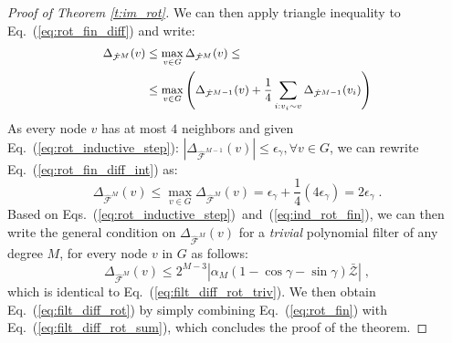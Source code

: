 \documentclass[10pt,journal,compsoc]{IEEEtran}
\newcommand{\renata}[1]{\textcolor{black}{#1}}
\newcommand{\hmF}{\hat{\mathcal{F}}}
\newcommand{\norm}[1]{\left|#1\right|}
\begin{document}
\begin{proof}[Proof of Theorem \ref{t:im_rot}]
		\noindent
			We can then apply triangle inequality to Eq.~(\ref{eq:rot_fin_diff}) and write:
		\begin{equation}
		\small
		\begin{aligned}
		\Delta_{\hmF^{M}} (v) & \leq \max_{v \in G} \Delta_{\hmF^{M}} (v) \leq \\
		& \leq \max_{v \in G} \left( \Delta_{\hmF^{M-1}}(v) + \frac{1}{4} \sum\limits_{i: v_i \sim v} \Delta_{\hmF^{M-1}} (v_i) \right)
		\end{aligned}
		\label{eq:rot_fin_diff_int}
		\end{equation}
		\noindent
		As every node $v$ has at most $4$ neighbors and given Eq.~({\ref{eq:rot_inductive_step}): $| \Delta_{\hmF^{M-1}} (v) | \leq \epsilon_\gamma, \forall v \in G$, we can rewrite Eq.~(\ref{eq:rot_fin_diff_int}) as}:
		\begin{equation}
		\Delta_{\hmF^{M}}(v) \leq \max_{v \in G} \Delta_{\hmF^{M}} (v) = \epsilon_\gamma + \frac{1}{4}(4 \epsilon_\gamma) = 2\epsilon_\gamma \;.
		\label{eq:ind_rot_fin}
		\end{equation}
		\noindent
		Based on Eqs.~(\ref{eq:rot_inductive_step})~and~(\ref{eq:ind_rot_fin}), we can then write the general condition on $\Delta_{\hmF^{M}}(v)$ for a \emph{trivial} polynomial filter of any degree $M$, for every node $v$ in $G$ as follows:
		\begin{equation}
		\Delta_{\hmF^{M}} (v) \leq 2^{M-3} \norm{\alpha_{M} (1 - \cos \gamma - \sin \gamma) \bar{\mathcal{Z}}} \;,
		\label{eq:rot_fin}
		\end{equation}
		\noindent
		which is identical to Eq.~(\ref{eq:filt_diff_rot_triv}). We then obtain Eq.~(\ref{eq:filt_diff_rot}) by simply combining Eq.~(\ref{eq:rot_fin}) with Eq.~(\ref{eq:filt_diff_rot_sum}), which concludes the proof of the theorem.
	\end{proof}
\end{document}
